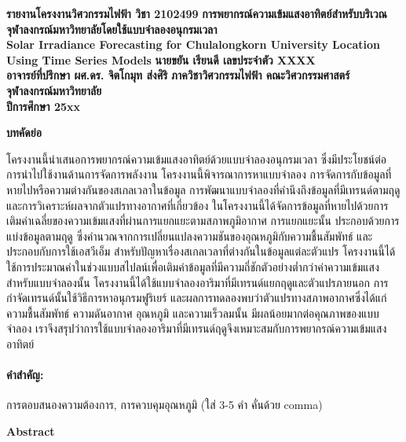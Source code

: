 \documentclass[11pt,a4paper]{article}
\begin{document}
\thispagestyle{empty}
\begin{center}
\doublespacing
{\LARGE \bf รายงานโครงงานวิศวกรรมไฟฟ้า วิชา 2102499}
\vfill
{ 
\LARGE \bf
การพยากรณ์ความเข้มแสงอาทิตย์สำหรับบริเวณจุฬาลงกรณ์มหาวิทยาลัยโดยใช้แบบจำลองอนุกรมเวลา \\[2ex]
Solar Irradiance Forecasting for Chulalongkorn University Location Using Time Series Models
}
\vfill
{\LARGE \bf นายขยัน เรียนดี เลขประจำตัว XXXX}\\[2ex]
{\LARGE \bf อาจารย์ที่ปรึกษา ผศ.ดร. จิตโกมุท ส่งศิริ}
\vfill
{\LARGE \bf ภาควิชาวิศวกรรมไฟฟ้า คณะวิศวกรรมศาสตร์}\\[2ex]
{\LARGE \bf จุฬาลงกรณ์มหาวิทยาลัย}\\[2ex]
{\LARGE \bf ปีการศึกษา 25xx}
\end{center}

\newpage
\thispagestyle{empty}
\begin{center}
\textbf{บทคัดย่อ}
\end{center}

โครงงานนี้นำเสนอการพยากรณ์ความเข้มแสงอาทิตย์ด้วยแบบจำลองอนุกรมเวลา ซึ่งมีประโยชน์ต่อการนำไปใช้งานด้านการจัดการพลังงาน โครงงานนี้พิจารณาการหาแบบจำลอง การจัดการกับข้อมูลที่หายไปหรือความต่างกันของสเกลเวลาในข้อมูล การพัฒนาแบบจำลองที่คำนึงถึงข้อมูลที่มีเทรนด์ตามฤดู และการวิเคราะห์ผลจากตัวแปรทางอากาศที่เกี่ยวข้อง ในโครงงานนี้ได้จัดการข้อมูลที่หายไปด้วยการเติมค่าเฉลี่ยของความเข้มแสงที่ผ่านการแยกแยะตามสภาพภูมิอากาศ การแยกแยะนั้น ประกอบด้วยการแบ่งข้อมูลตามฤดู ซึ่งคำนวณจากการเปลี่ยนแปลงความชันของอุณหภูมิกับความชื้นสัมพัทธ์ และประกอบกับการใช้เอสวีเอ็ม สำหรับปัญหาเรื่องสเกลเวลาที่ต่างกันในข้อมูลแต่ละตัวแปร โครงงานนี้ได้ใช้การประมาณค่าในช่วงแบบสไปลน์เพื่อเติมค่าข้อมูลที่มีความถี่ชักตัวอย่างต่ำกว่าค่าความเข้มแสง สำหรับแบบจำลองนั้น โครงงานนี้ได้ใช้แบบจำลองอาริมาที่มีเทรนด์แยกฤดูและตัวแปรภายนอก การกำจัดเทรนด์นั้นใช้วิธีการหาอนุกรมฟูริเยร์ และผลการทดลองพบว่าตัวแปรทางสภาพอากาศซึ่งได้แก่ ความชื้นสัมพัทธ์ ความดันอากาศ อุณหภูมิ และความเร็วลมนั้น มีผลน้อยมากต่อคุณภาพของแบบจำลอง เราจึงสรุปว่าการใช้แบบจำลองอาริมาที่มีเทรนด์ฤดูจึงเหมาะสมกับการพยากรณ์ความเข้มแสงอาทิตย์

\paragraph{\textbf คำสำคัญ:} การตอบสนองความต้องการ, การควบคุมอุณหภูมิ (ใส่ 3-5 คำ คั่นด้วย comma)

\begin{center}
\textbf{Abstract}
\end{center}
\end{document}
